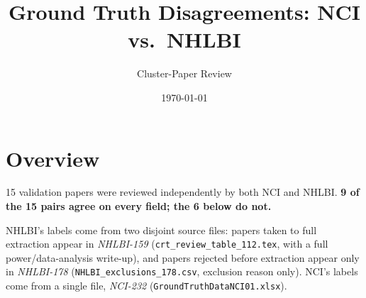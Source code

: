 \documentclass[11pt]{article}
\title{Ground Truth Disagreements: NCI vs.\ NHLBI}
\author{Cluster-Paper Review}
\date{\today}
\begin{document}
\maketitle

\section{Overview}

15 validation papers were reviewed independently by both NCI and NHLBI. 
\textbf{9 of the 15 pairs agree on every field; the 6 below do not.}

NHLBI's labels come from two disjoint source files: papers taken to full extraction appear in
\emph{NHLBI-159} (\texttt{crt\_review\_table\_112.tex}, with a full power/data-analysis
write-up), and papers rejected before extraction appear only in \emph{NHLBI-178}
(\texttt{NHLBI\_exclusions\_178.csv}, exclusion reason only). NCI's labels come from a single
file, \emph{NCI-232} (\texttt{GroundTruthDataNCI01.xlsx}).
\end{document}
